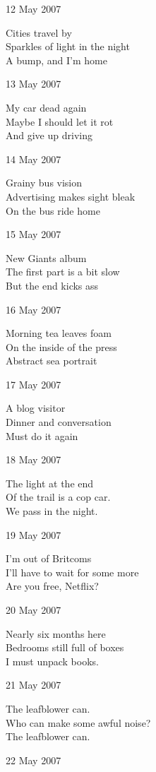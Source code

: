 \documentclass[12pt]{article}
\begin{document}
\newpage

12 May 2007

Cities travel by \\
Sparkles of light in the night \\
A bump, and I'm home

13 May 2007

My car dead again \\
Maybe I should let it rot \\
And give up driving

14 May 2007

Grainy bus vision \\
Advertising makes sight bleak \\
On the bus ride home

15 May 2007

New Giants album \\
The first part is a bit slow \\
But the end kicks ass

16 May 2007

Morning tea leaves foam \\
On the inside of the press \\
Abstract sea portrait

17 May 2007

A blog visitor \\
Dinner and conversation \\
Must do it again

18 May 2007

The light at the end \\
Of the trail is a cop car. \\
We pass in the night.

\newpage

19 May 2007

I'm out of Britcoms \\
I'll have to wait for some more \\
Are you free, Netflix?

20 May 2007

Nearly six months here \\
Bedrooms still full of boxes \\
I must unpack books.

21 May 2007

The leafblower can. \\
Who can make some awful noise? \\
The leafblower can.

22 May 2007
\end{document}
